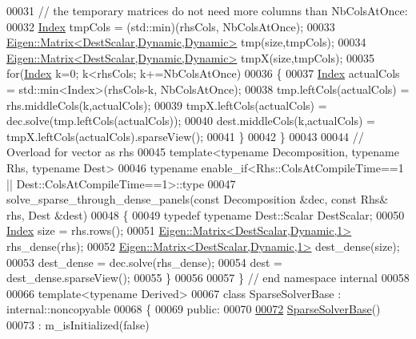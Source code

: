 \begin{DoxyCode}
00031   \textcolor{comment}{// the temporary matrices do not need more columns than NbColsAtOnce:}
00032   \hyperlink{namespace_eigen_a62e77e0933482dafde8fe197d9a2cfde}{Index} tmpCols = (std::min)(rhsCols, NbColsAtOnce); 
00033   \hyperlink{group___core___module_class_eigen_1_1_matrix}{Eigen::Matrix<DestScalar,Dynamic,Dynamic>} tmp(size,tmpCols);
00034   \hyperlink{group___core___module_class_eigen_1_1_matrix}{Eigen::Matrix<DestScalar,Dynamic,Dynamic>} tmpX(size,tmpCols);
00035   \textcolor{keywordflow}{for}(\hyperlink{namespace_eigen_a62e77e0933482dafde8fe197d9a2cfde}{Index} k=0; k<rhsCols; k+=NbColsAtOnce)
00036   \{
00037     \hyperlink{namespace_eigen_a62e77e0933482dafde8fe197d9a2cfde}{Index} actualCols = std::min<Index>(rhsCols-k, NbColsAtOnce);
00038     tmp.leftCols(actualCols) = rhs.middleCols(k,actualCols);
00039     tmpX.leftCols(actualCols) = dec.solve(tmp.leftCols(actualCols));
00040     dest.middleCols(k,actualCols) = tmpX.leftCols(actualCols).sparseView();
00041   \}
00042 \}
00043 
00044 \textcolor{comment}{// Overload for vector as rhs}
00045 \textcolor{keyword}{template}<\textcolor{keyword}{typename} Decomposition, \textcolor{keyword}{typename} Rhs, \textcolor{keyword}{typename} Dest>
00046 \textcolor{keyword}{typename} enable\_if<Rhs::ColsAtCompileTime==1 || Dest::ColsAtCompileTime==1>::type
00047 solve\_sparse\_through\_dense\_panels(\textcolor{keyword}{const} Decomposition &dec, \textcolor{keyword}{const} Rhs& rhs, Dest &dest)
00048 \{
00049   \textcolor{keyword}{typedef} \textcolor{keyword}{typename} Dest::Scalar DestScalar;
00050   \hyperlink{namespace_eigen_a62e77e0933482dafde8fe197d9a2cfde}{Index} size = rhs.rows();
00051   \hyperlink{group___core___module_class_eigen_1_1_matrix}{Eigen::Matrix<DestScalar,Dynamic,1>} rhs\_dense(rhs);
00052   \hyperlink{group___core___module_class_eigen_1_1_matrix}{Eigen::Matrix<DestScalar,Dynamic,1>} dest\_dense(size);
00053   dest\_dense = dec.solve(rhs\_dense);
00054   dest = dest\_dense.sparseView();
00055 \}
00056 
00057 \} \textcolor{comment}{// end namespace internal}
00058 
00066 \textcolor{keyword}{template}<\textcolor{keyword}{typename} Derived>
00067 \textcolor{keyword}{class }SparseSolverBase : internal::noncopyable
00068 \{
00069   \textcolor{keyword}{public}:
00070 
\hyperlink{group___sparse_core___module_aacd99fa17db475e74d3834767f392f33}{00072}     \hyperlink{group___sparse_core___module_aacd99fa17db475e74d3834767f392f33}{SparseSolverBase}()
00073       : m\_isInitialized(false)

\end{DoxyCode}
